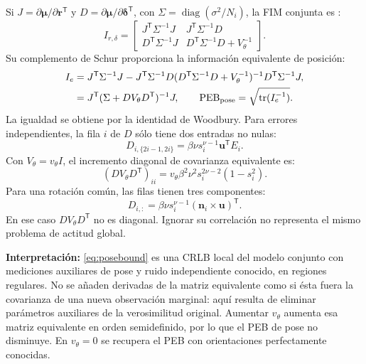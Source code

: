 \documentclass[11pt,a4paper]{article}
\begin{document}
Si $J=\partial\bm\mu/\partial\mathbf r^{\mathsf T}$ y $D=\partial\bm\mu/\partial\boldsymbol\delta^{\mathsf T}$, con $\Sigma=\operatorname{diag}(\sigma^2/N_i)$, la FIM conjunta es \cite{kay}:
\begin{equation}
 I_{r,\delta}=\begin{bmatrix}
 J^{\mathsf T}\Sigma^{-1}J & J^{\mathsf T}\Sigma^{-1}D\\
 D^{\mathsf T}\Sigma^{-1}J & D^{\mathsf T}\Sigma^{-1}D+V_\theta^{-1}
 \end{bmatrix}.
\end{equation}
Su complemento de Schur proporciona la información equivalente de posición:
\begin{align}
 I_e&=J^{\mathsf T}\Sigma^{-1}J-J^{\mathsf T}\Sigma^{-1}D
 (D^{\mathsf T}\Sigma^{-1}D+V_\theta^{-1})^{-1}D^{\mathsf T}\Sigma^{-1}J,\\
 &=J^{\mathsf T}(\Sigma+DV_\theta D^{\mathsf T})^{-1}J,\qquad
 \mathrm{PEB}_{\rm pose}=\sqrt{\operatorname{tr}(I_e^{-1})}.
\label{eq:posebound}
\end{align}
La igualdad se obtiene por la identidad de Woodbury. Para errores independientes, la fila $i$ de $D$ sólo tiene dos entradas no nulas:
\begin{equation}
 D_{i,\{2i-1,2i\}}=\beta\nu s_i^{\nu-1}\mathbf u^{\mathsf T}E_i.
\end{equation}
Con $V_\theta=v_\theta I$, el incremento diagonal de covarianza equivalente es:
\begin{equation}
 (DV_\theta D^{\mathsf T})_{ii}=v_\theta\beta^2\nu^2s_i^{2\nu-2}(1-s_i^2).
\end{equation}
Para una rotación común, las filas tienen tres componentes:
\begin{equation}
 D_{i,:}=\beta\nu s_i^{\nu-1}(\mathbf n_i\times\mathbf u)^{\mathsf T}.
\end{equation}
En ese caso $DV_\theta D^{\mathsf T}$ no es diagonal. Ignorar su correlación no representa el mismo problema de actitud global.

\textbf{Interpretación:} \eqref{eq:posebound} es una CRLB local del modelo conjunto con mediciones auxiliares de pose y ruido independiente conocido, en regiones regulares. No se añaden derivadas de la matriz equivalente como si ésta fuera la covarianza de una nueva observación marginal: aquí resulta de eliminar parámetros auxiliares de la verosimilitud original. Aumentar $v_\theta$ aumenta esa matriz equivalente en orden semidefinido, por lo que el PEB de pose no disminuye. En $v_\theta=0$ se recupera el PEB con orientaciones perfectamente conocidas.
\end{document}
